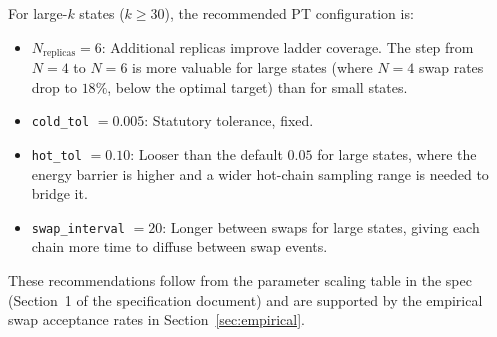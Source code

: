For large-$k$ states ($k \ge 30$), the recommended PT configuration is:
\begin{itemize}
\item $N_{\mathrm{replicas}} = 6$: Additional replicas improve ladder coverage.
  The step from $N=4$ to $N=6$ is more valuable for large states (where
  $N=4$ swap rates drop to $18\%$, below the optimal target) than for
  small states.
\item \texttt{cold\_tol} $= 0.005$: Statutory tolerance, fixed.
\item \texttt{hot\_tol} $= 0.10$: Looser than the default $0.05$ for large
  states, where the energy barrier is higher and a wider hot-chain
  sampling range is needed to bridge it.
\item \texttt{swap\_interval} $= 20$: Longer between swaps for large states,
  giving each chain more time to diffuse between swap events.
\end{itemize}
These recommendations follow from the parameter scaling table in the spec
(Section~1 of the specification document) and are supported by the
empirical swap acceptance rates in Section~\ref{sec:empirical}.
